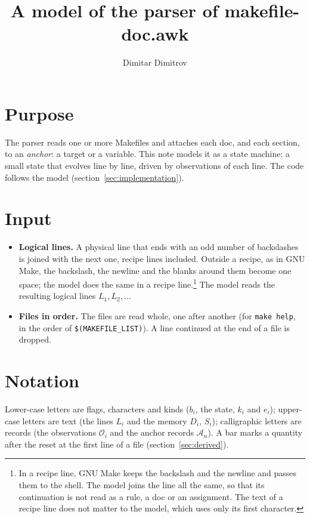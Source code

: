 \documentclass[11pt]{article}
\title{A model of the parser of makefile-doc.awk}
\author{Dimitar Dimitrov}
\date{}
\newcommand{\code}[1]{\mbox{\texttt{#1}}}
\begin{document}
\maketitle

\section{Purpose}

The parser reads one or more Makefiles and attaches each doc, and each section, to an
\emph{anchor}: a target or a variable. This note models it as a state machine: a small
state that evolves line by line, driven by observations of each line. The code follows the
model (section~\ref{sec:implementation}).

\section{Input}

\begin{itemize}
  \item \textbf{Logical lines.} A physical line that ends with an odd number of
        backslashes is joined with the next one, recipe lines included. Outside a
        recipe, as in GNU Make, the backslash, the newline and the blanks around them
        become one space; the model does the same in a recipe
        line.\footnote{In a recipe line, GNU Make keeps the backslash and the newline
        and passes them to the shell. The model joins the line all the same, so that its
        continuation is not read as a rule, a doc or an assignment. The text of a
        recipe line does not matter to the model, which uses only its first character.}
        The model reads the resulting logical lines $L_1, L_2, \dots$
  \item \textbf{Files in order.} The files are read whole, one after another (for
        \code{make help}, in the order of \code{\$(MAKEFILE\_LIST)}). A line continued at
        the end of a file is dropped.
\end{itemize}

\section{Notation}

Lower-case letters are flags, characters and kinds ($b_i$, the state, $k_i$ and $e_i$);
upper-case letters are text (the lines $L_i$ and the memory $D_i$, $S_i$); calligraphic
letters are records (the observations $\mathcal{O}_i$ and the anchor records
$\mathcal{A}_n$). A bar marks a quantity after the reset at the first line of a file
(section~\ref{sec:derived}).
\end{document}
